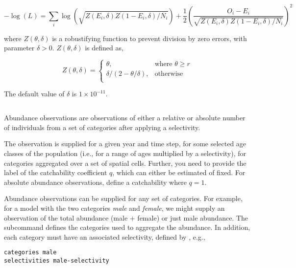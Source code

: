\begin{equation}
  -\log \left(L \right)= \sum\limits_i \log \left( \sqrt{Z\left(E_i,\delta \right)Z\left(1-E_i,\delta\right)/N_i} \right)     + \frac{1}{2} \left( \frac{O_i-E_i}{\sqrt{Z\left(E_i,\delta\right)Z\left(1-E_i,\delta \right)/N_i}} \right)^2
\end{equation}

where $Z \left(\theta,\delta \right)$ is a robustifying function to prevent division by zero errors, with parameter $\delta>0$. $Z \left(\theta,\delta \right)$ is defined as,

\begin{equation}
   Z \left(\theta,\delta \right) = \begin{cases}
	  \theta, & \text{where $\theta \ge r$} \\
	  \delta/\left( 2-\theta/\delta \right), & \text{otherwise} \\  
  \end{cases}
\end{equation}

The default value of $\delta$ is $1 \times 10^{-11}$.

\subsection{}

Abundance observations are observations of either a relative or absolute number of individuals from a set of categories after applying a selectivity. 

The observation is supplied for a given year and time step, for some selected age classes of the population (i.e., for a range of ages multiplied by a selectivity), for categories aggregated over a set of spatial cells. Further, you need to provide the label of the catchability coefficient $q$, which can either be estimated of fixed. For absolute abundance observations, define a catchability where $q=1$.

Abundance observations can be supplied for any set of categories. For example, for a model with the two categories \emph{male} and \emph{female}, we might supply an observation of the total abundance (male $+$ female) or just male abundance. The subcommand  defines the categories used to aggregate the abundance. In addition, each category must have an associated selectivity, defined by , e.g., 

\begin{verbatim}
categories male
selectivities male-selectivity
\end{verbatim}

